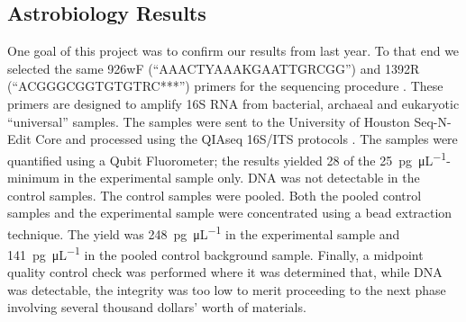 \subsection{Astrobiology Results}
\label{sec:Astrobiology-Results}

One goal of this project was to confirm our results from last year. To that end we selected the same 926wF (“AAACTYAAAKGAATTGRCGG”) and 1392R (“ACGGGCGGTGTGTRC***”) primers for the sequencing procedure \cite{SORA}. These primers are designed to amplify 16S RNA from bacterial, archaeal and eukaryotic “universal” samples. The samples were sent to the University of Houston Seq-N-Edit Core \cite{Seq-N-Edit Core} and processed using the QIAseq 16S/ITS protocols \cite{QIAseq}. The samples were quantified using a Qubit Fluorometer; the results yielded 28 of the \SI{25}{\pico\gram\per\micro\liter}-minimum in the experimental sample only. DNA was not detectable in the control samples. The control samples were pooled. Both the pooled control samples and the experimental sample were concentrated using a bead extraction technique. The yield was \SI{248}{\pico\gram\per\micro\liter} in the experimental sample and \SI{141}{\pico\gram\per\micro\liter} in the pooled control background sample. Finally, a midpoint quality control check was  performed where it was determined that, while DNA was detectable, the integrity was too low to merit proceeding to the next phase involving several thousand dollars’ worth of materials. 